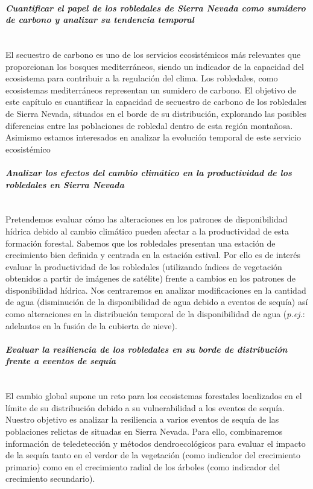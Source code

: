 \paragraph{\emph{Cuantificar el papel de los robledales de Sierra Nevada como sumidero de carbono y analizar su tendencia temporal}} \mbox{} \\
El secuestro de carbono es uno de los servicios ecosistémicos más relevantes que proporcionan los bosques mediterráneos, siendo un indicador de la capacidad del ecosistema para contribuir a la regulación del clima. Los robledales, como ecosistemas mediterráneos representan un sumidero de carbono. El objetivo de este capítulo es cuantificar la capacidad  de secuestro de carbono de los robledales de Sierra Nevada, situados en el borde de su distribución, explorando las posibles diferencias entre las poblaciones de robledal dentro de esta región montañosa. Asimismo estamos interesados en analizar la evolución temporal de este servicio ecosistémico 

\paragraph{\emph{Analizar los efectos del cambio climático en la productividad de los \\ robledales en Sierra Nevada}} \mbox{} \\
Pretendemos evaluar cómo las alteraciones en los patrones de disponibilidad hídrica debido al cambio climático pueden afectar a la productividad de esta formación forestal. Sabemos que los robledales presentan una estación de crecimiento bien definida y centrada en la estación estival. Por ello es de interés evaluar la productividad de los robledales (utilizando índices de vegetación obtenidos a partir de imágenes de satélite) frente a cambios en los patrones de disponibilidad hídrica. Nos centraremos en analizar modificaciones en la cantidad de agua (disminución de la disponibilidad de agua debido a eventos de sequía) así como alteraciones en la distribución temporal de la disponibilidad de agua (\emph{p.ej.}: adelantos en la fusión de la cubierta de nieve).

\paragraph{\emph{Evaluar la resiliencia de los robledales en su borde de distribución frente a eventos de sequía}}\mbox{} \\
El cambio global supone un reto para los ecosistemas forestales localizados en el límite de su distribución debido a su vulnerabilidad a los eventos de sequía. Nuestro objetivo es analizar la resiliencia a varios eventos de sequía de las poblaciones relictas de \Qp situadas en Sierra Nevada. Para ello, combinaremos información de teledetección y métodos dendroecológicos para evaluar el impacto de la sequía tanto en el verdor de la vegetación (como indicador del crecimiento primario) como en el crecimiento radial de los árboles (como indicador del crecimiento secundario).

